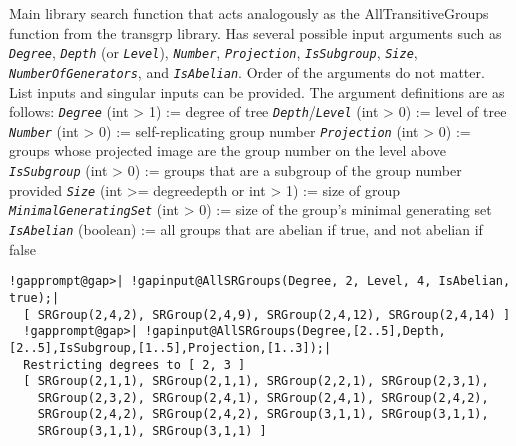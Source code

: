 \documentclass[a4paper,11pt]{report}
\begin{document}
{{{ Main library search function that acts analogously as the AllTransitiveGroups
function from the \textsf{transgrp} library. Has several possible input arguments such as \mbox{\texttt{\mdseries\slshape Degree}}, \mbox{\texttt{\mdseries\slshape Depth}} (or \mbox{\texttt{\mdseries\slshape Level}}), \mbox{\texttt{\mdseries\slshape Number}}, \mbox{\texttt{\mdseries\slshape Projection}}, \mbox{\texttt{\mdseries\slshape IsSubgroup}}, \mbox{\texttt{\mdseries\slshape Size}}, \mbox{\texttt{\mdseries\slshape NumberOfGenerators}}, and \mbox{\texttt{\mdseries\slshape IsAbelian}}. Order of the arguments do not matter. List inputs and singular inputs can be
provided. The argument definitions are as follows: \mbox{\texttt{\mdseries\slshape Degree}} (int {\textgreater} 1) := degree of tree \mbox{\texttt{\mdseries\slshape Depth}}/\mbox{\texttt{\mdseries\slshape Level}} (int {\textgreater} 0) := level of tree \mbox{\texttt{\mdseries\slshape Number}} (int {\textgreater} 0) := self-replicating group number \mbox{\texttt{\mdseries\slshape Projection}} (int {\textgreater} 0) := groups whose projected image are the group number on
the level above \mbox{\texttt{\mdseries\slshape IsSubgroup}} (int {\textgreater} 0) := groups that are a subgroup of the group number
provided \mbox{\texttt{\mdseries\slshape Size}} (int {\textgreater}= degree\texttt{}depth or int {\textgreater} 1)
:= size of group \mbox{\texttt{\mdseries\slshape MinimalGeneratingSet}} (int {\textgreater} 0) := size of the group's minimal generating set \mbox{\texttt{\mdseries\slshape IsAbelian}} (boolean) := all groups that are abelian if true, and not abelian if false }

 
\begin{Verbatim}[commandchars=!@|,fontsize=\small,frame=single,label=Example]
  !gapprompt@gap>| !gapinput@AllSRGroups(Degree, 2, Level, 4, IsAbelian, true);|
  [ SRGroup(2,4,2), SRGroup(2,4,9), SRGroup(2,4,12), SRGroup(2,4,14) ]
  !gapprompt@gap>| !gapinput@AllSRGroups(Degree,[2..5],Depth,[2..5],IsSubgroup,[1..5],Projection,[1..3]);|
  Restricting degrees to [ 2, 3 ]
  [ SRGroup(2,1,1), SRGroup(2,1,1), SRGroup(2,2,1), SRGroup(2,3,1),
    SRGroup(2,3,2), SRGroup(2,4,1), SRGroup(2,4,1), SRGroup(2,4,2),
    SRGroup(2,4,2), SRGroup(2,4,2), SRGroup(3,1,1), SRGroup(3,1,1),
    SRGroup(3,1,1), SRGroup(3,1,1) ]
\end{Verbatim}
 

}}
\end{document}
